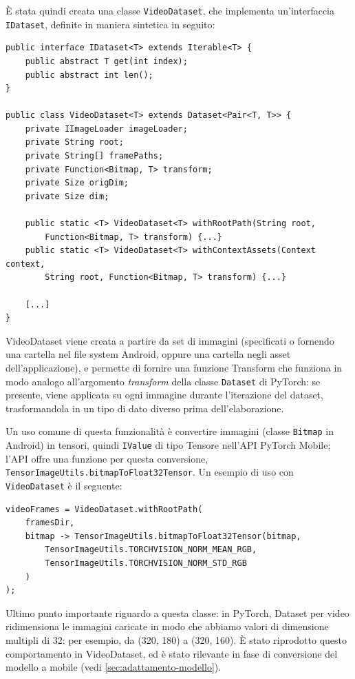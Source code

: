 È stata quindi creata una classe \texttt{VideoDataset}, che implementa un'interfaccia 
\texttt{IDataset}, definite in maniera sintetica in seguito:

\begin{lstlisting}
public interface IDataset<T> extends Iterable<T> {
    public abstract T get(int index);
    public abstract int len();
}

public class VideoDataset<T> extends Dataset<Pair<T, T>> {
    private IImageLoader imageLoader;
    private String root;
    private String[] framePaths;
    private Function<Bitmap, T> transform;
    private Size origDim;
    private Size dim;

    public static <T> VideoDataset<T> withRootPath(String root, 
        Function<Bitmap, T> transform) {...}
    public static <T> VideoDataset<T> withContextAssets(Context context, 
        String root, Function<Bitmap, T> transform) {...}

    [...]
}
\end{lstlisting}

VideoDataset viene creata a partire da set di immagini (specificati o fornendo una cartella
nel file system Android, oppure una cartella negli asset dell'applicazione), e permette di 
fornire una funzione Transform che funziona in modo analogo all'argomento \emph{transform}
della classe \texttt{Dataset} di PyTorch: se presente, viene applicata su ogni immagine
durante l'iterazione del dataset, trasformandola in un tipo di dato diverso prima 
dell'elaborazione. 

Un uso comune di questa funzionalità è convertire immagini (classe
\texttt{Bitmap} in Android) in tensori, quindi \texttt{IValue} di tipo Tensore nell'API
PyTorch Mobile; l'API offre una funzione per questa conversione, 
\texttt{TensorImageUtils.bitmapToFloat32Tensor}. Un esempio di uso con \texttt{VideoDataset} 
è il seguente:

\begin{lstlisting}
videoFrames = VideoDataset.withRootPath(
    framesDir, 
    bitmap -> TensorImageUtils.bitmapToFloat32Tensor(bitmap,
        TensorImageUtils.TORCHVISION_NORM_MEAN_RGB,
        TensorImageUtils.TORCHVISION_NORM_STD_RGB
    )
);
\end{lstlisting}

Ultimo punto importante riguardo a questa classe: in PyTorch, Dataset per video ridimensiona
le immagini caricate in modo che abbiamo valori di dimensione multipli di 32: per esempio, 
da (320, 180) a (320, 160). È stato riprodotto questo comportamento in VideoDataset, ed è stato
rilevante in fase di conversione del modello a mobile (vedi \ref{sec:adattamento-modello}).

